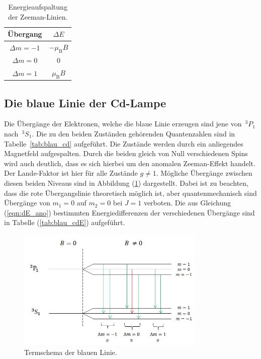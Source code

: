 \begin{table}[H]
    \centering
    \caption{Energieaufspaltung der Zeeman-Linien.}
    \begin{tabular}{cc}
        \toprule
    {Übergang} & {$\Delta E$} \\
		\midrule
	  $\Delta m=-1$ & $-\mu_{\mathup{B}}B$ \\
    $\Delta m=0$ & 0 \\
    $\Delta m=1$ & $\mu_{\mathup{B}}B$ \\
    \bottomrule
	\end{tabular}
    \label{tab:rot_cdE}
\end{table}

\subsection{Die blaue Linie der Cd-Lampe}
Die Übergänge der Elektronen, welche die blaue Linie erzeugen sind jene
von~$^{3}P_1$ nach~$^{3}S_1$. Die zu den beiden Zuständen gehörenden Quantenzahlen
sind in Tabelle~\ref{tab:blau_cd} aufgeführt. Die Zustände werden durch ein
anliegendes Magnetfeld aufgespalten. Durch die beiden gleich von Null verschiedenen
Spins wird auch deutlich, dass es sich hierbei um den anomalen Zeeman-Effekt handelt.
Der Lande-Faktor ist hier für alle Zustände $g\neq1$. Mögliche Übergänge zwischen
diesen beiden Niveaus sind in Abbildung (\ref{fig:therm_blau}) dargestellt. Dabei ist
zu beachten, dass die rote Übergangslinie theoretisch möglich ist, aber quantenmechanisch
sind Übergänge von $m_1 = 0$ auf $m_2 = 0$ bei $J=1$ verboten.  Die aus
Gleichung (\ref{eqn:dE_ano}) bestimmten Energiedifferenzen der verschiedenen Übergänge
sind in Tabelle (\ref{tab:blau_cdE}) aufgeführt.

\begin{figure}
    \centering
    \includegraphics[width=0.8\textwidth]{graphics/termschema_blau.jpg}
    \caption{Termschema der blauen Linie.}
    \label{fig:therm_blau}
\end{figure}

